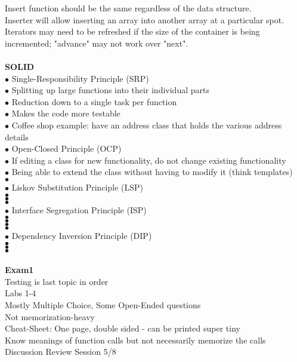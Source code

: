 \documentclass[11pt]{article}
\begin{document}
\indent Insert function should be the same regardless of the data structure.\\
\indent Inserter will allow inserting an array into another array at a particular spot.\\
\indent Iterators may need to be refreshed if the size of the container is being incremented; "advance" may
not work over "next".\\
\\
\textbf{SOLID} \\
\indent $\bullet$ Single-Responsibility Principle (SRP) \\
\indent\indent $\bullet$ Splitting up large functions into their individual parts \\
\indent\indent $\bullet$ Reduction down to a single task per function \\
\indent\indent $\bullet$ Makes the code more testable \\
\indent\indent $\bullet$ Coffee shop example: have an address class that holds the various address details \\
\indent $\bullet$ Open-Closed Principle (OCP) \\
\indent\indent $\bullet$ If editing a class for new functionality, do not change existing functionality \\
\indent\indent $\bullet$ Being able to extend the class without having to modify it (think templates) \\
\indent\indent $\bullet$  \\
\indent $\bullet$ Liskov Substitution Principle (LSP) \\
\indent\indent $\bullet$  \\
\indent\indent $\bullet$  \\
\indent\indent $\bullet$  \\
\indent $\bullet$ Interface Segregation Principle (ISP) \\
\indent\indent $\bullet$  \\
\indent\indent $\bullet$  \\
\indent\indent $\bullet$  \\
\indent\indent $\bullet$  \\
\indent $\bullet$ Dependency Inversion Principle (DIP) \\
\indent\indent $\bullet$  \\
\indent\indent $\bullet$  \\
\indent\indent $\bullet$  \\
\\
\textbf{Exam1}\\
\indent Testing is last topic in order \\
\indent Labs 1-4 \\
\indent Mostly Multiple Choice, Some Open-Ended questions\\
\indent Not memorization-heavy \\
\indent Cheat-Sheet: One page, double sided - can be printed super tiny \\
\indent Know meanings of function calls but not necessarily memorize the calls \\
\indent Discussion Review Session 5/8\\
\indent 
\end{document}
